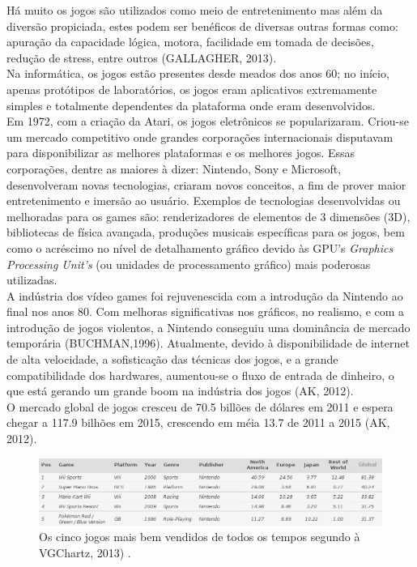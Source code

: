 \documentclass{article}
\begin{document}
Há muito os jogos são utilizados como meio de entretenimento mas além da diversão propiciada, estes podem ser benéficos de diversas outras formas como: apuração da capacidade lógica, motora, facilidade em tomada de decisões, redução de stress, entre outros (GALLAGHER, 2013).
\\
	Na informática, os jogos estão presentes desde meados dos anos 60; no início, apenas protótipos de laboratórios, os jogos eram aplicativos extremamente simples e totalmente dependentes da plataforma onde eram desenvolvidos.
\\
Em 1972, com a criação da Atari, os jogos eletrônicos se popularizaram. Criou-se um mercado competitivo onde grandes corporações internacionais disputavam para disponibilizar as melhores plataformas e os melhores jogos.  Essas corporações, dentre as maiores à dizer: Nintendo, Sony e Microsoft, desenvolveram novas tecnologias, criaram novos conceitos, a fim de prover maior entretenimento e imersão ao usuário. Exemplos de tecnologias desenvolvidas ou melhoradas para os games são: renderizadores de elementos de 3 dimensões (3D), bibliotecas de física avançada, produções musicais específicas para os jogos, bem como o acréscimo no nível de detalhamento gráfico devido às GPU's \textit{Graphics Processing Unit's} (ou unidades de processamento gráfico) mais poderosas utilizadas.
\\
A indústria dos vídeo games foi rejuvenescida com a introdução da Nintendo ao final nos anos 80. Com melhoras significativas  nos gráficos, no realismo, e com a introdução de jogos violentos, a Nintendo conseguiu uma dominância de mercado temporária (BUCHMAN,1996).
	Atualmente, devido à disponibilidade de internet de alta velocidade, a sofisticação das técnicas dos jogos, e a grande compatibilidade dos hardwares, aumentou-se o fluxo de entrada de dinheiro, o que está gerando um grande boom na indústria dos jogos (AK, 2012).
\\
	O mercado global de jogos cresceu de 70.5 billões de dólares em 2011 e espera chegar a 117.9 bilhões em 2015, crescendo em méia 13.7 de 2011 a 2015 (AK, 2012).


\begin{figure}[!htbp]
    \begin{center}
        \includegraphics[width=\textwidth]{asset/img/bestSelledGames.jpg}
               \caption{Os cinco jogos mais bem vendidos de todos os tempos segundo à VGChartz, 2013) . \label{fig:Jogos mais bem vendidos}}
    \end{center}
\end{figure}
\end{document}
